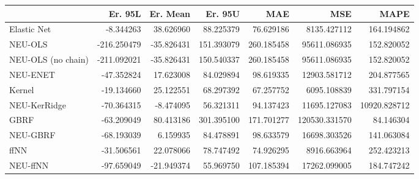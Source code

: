 \begin{tabular}{lrrrrrr}
\toprule
{} &     Er. 95L &   Er. Mean &     Er. 95U &         MAE &            MSE &          MAPE \\
\midrule
Elastic Net        &   -8.344263 &  38.626960 &   88.225379 &   76.629186 &    8135.427112 &    164.194862 \\
NEU-OLS            & -216.250479 & -35.826431 &  151.393079 &  260.185458 &   95611.086935 &    152.820052 \\
NEU-OLS (no chain) & -211.092021 & -35.826431 &  150.540337 &  260.185458 &   95611.086935 &    152.820052 \\
NEU-ENET           &  -47.352824 &  17.623008 &   84.029894 &   98.619335 &   12903.581712 &    204.877565 \\
Kernel             &  -19.134660 &  25.122551 &   68.297392 &   67.257752 &    6095.108839 &    331.797154 \\
NEU-KerRidge       &  -70.364315 &  -8.474095 &   56.321311 &   94.137423 &   11695.127083 &  10920.828712 \\
GBRF               &  -63.209049 &  80.413186 &  301.395100 &  171.701277 &  120530.331570 &     84.146304 \\
NEU-GBRF           &  -68.193039 &   6.159935 &   84.478891 &   98.633579 &   16698.303526 &    141.063084 \\
ffNN               &  -31.506561 &  22.078066 &   78.747492 &   74.926295 &    8916.663964 &    252.423213 \\
NEU-ffNN           &  -97.659049 & -21.949374 &   55.969750 &  107.185394 &   17262.099005 &    184.747242 \\
\bottomrule
\end{tabular}

